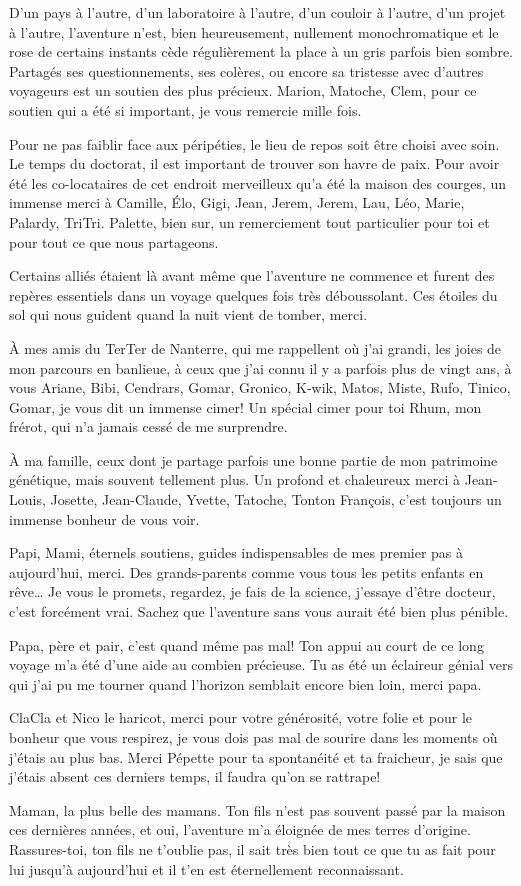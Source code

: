 D'un pays à l'autre, d'un laboratoire à l'autre, d'un couloir à l'autre,
d'un projet à l'autre, l'aventure n'est, bien heureusement, nullement
monochromatique et le rose de certains instants cède régulièrement la
place à un gris parfois bien sombre. Partagés ses questionnements, ses
colères, ou encore sa tristesse avec d'autres voyageurs est un soutien
des plus précieux. Marion, Matoche, Clem, pour ce soutien qui a été si
important, je vous remercie mille fois.

Pour ne pas faiblir face aux péripéties, le lieu de repos soit être
choisi avec soin. Le temps du doctorat, il est important de trouver son
havre de paix. Pour avoir été les co-locataires de cet endroit
merveilleux qu'a été la maison des courges, un immense merci à Camille,
Élo, Gigi, Jean, Jerem, Jerem, Lau, Léo, Marie, Palardy, TriTri.
Palette, bien sur, un remerciement tout particulier pour toi et pour
tout ce que nous partageons.

Certains alliés étaient là avant même que l'aventure ne commence et
furent des repères essentiels dans un voyage quelques fois très
déboussolant. Ces étoiles du sol qui nous guident quand la nuit vient de
tomber, merci.

À mes amis du TerTer de Nanterre, qui me rappellent où j'ai grandi, les
joies de mon parcours en banlieue, à ceux que j'ai connu il y a parfois
plus de vingt ans, à vous Ariane, Bibi, Cendrars, Gomar, Gronico, K-wik,
Matos, Miste, Rufo, Tinico, Gomar, je vous dit un immense cimer! Un
spécial cimer pour toi Rhum, mon frérot, qui n'a jamais cessé de me
surprendre.

À ma famille, ceux dont je partage parfois une bonne partie de mon
patrimoine génétique, mais souvent tellement plus. Un profond et
chaleureux merci à Jean-Louis, Josette, Jean-Claude, Yvette, Tatoche,
Tonton François, c'est toujours un immense bonheur de vous voir.

Papi, Mami, éternels soutiens, guides indispensables de mes premier pas
à aujourd'hui, merci. Des grands-parents comme vous tous les petits
enfants en rêve\ldots{} Je vous le promets, regardez, je fais de la
science, j'essaye d'être docteur, c'est forcément vrai. Sachez que
l'aventure sans vous aurait été bien plus pénible.

Papa, père et pair, c'est quand même pas mal! Ton appui au court de ce
long voyage m'a été d'une aide au combien précieuse. Tu as été un
éclaireur génial vers qui j'ai pu me tourner quand l'horizon semblait
encore bien loin, merci papa.

ClaCla et Nico le haricot, merci pour votre générosité, votre folie et
pour le bonheur que vous respirez, je vous dois pas mal de sourire dans
les moments où j'étais au plus bas. Merci Pépette pour ta spontanéité et
ta fraicheur, je sais que j'étais absent ces derniers temps, il faudra
qu'on se rattrape!

Maman, la plus belle des mamans. Ton fils n'est pas souvent passé par la
maison ces dernières années, et oui, l'aventure m'a éloignée de mes
terres d'origine. Rassures-toi, ton fils ne t'oublie pas, il sait très
bien tout ce que tu as fait pour lui jusqu'à aujourd'hui et il t'en est
éternellement reconnaissant.
